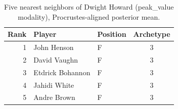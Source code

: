\begin{table}[htbp]
  \centering\small
  \begin{tabular}{rllc}
    \toprule
    Rank & Player & Position & Archetype \\
    \midrule
    1 & John Henson & F & 3 \\
    2 & David Vaughn & F & 3 \\
    3 & Etdrick Bohannon & F & 3 \\
    4 & Jahidi White & F & 3 \\
    5 & Andre Brown & F & 3 \\
    \bottomrule
  \end{tabular}
  \caption{Five nearest neighbors of Dwight Howard (peak_value modality), Procrustes-aligned posterior mean.}
  \label{tab:Dwight_Howard_neighbors_peak_value}
\end{table}

